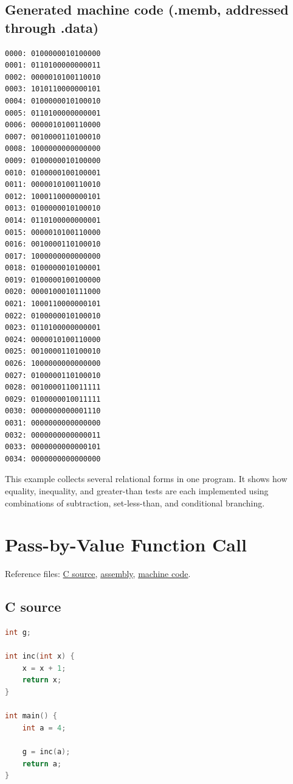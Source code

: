 \documentclass[12pt]{report}
\begin{document}
\subsection*{Generated machine code (.memb, addressed through .data)}
\begin{lstlisting}
0000: 0100000010100000
0001: 0110100000000011
0002: 0000010100110010
0003: 1010110000000101
0004: 0100000010100010
0005: 0110100000000001
0006: 0000010100110000
0007: 0010000110100010
0008: 1000000000000000
0009: 0100000010100000
0010: 0100000100100001
0011: 0000010100110010
0012: 1000110000000101
0013: 0100000010100010
0014: 0110100000000001
0015: 0000010100110000
0016: 0010000110100010
0017: 1000000000000000
0018: 0100000010100001
0019: 0100000100100000
0020: 0000100010111000
0021: 1000110000000101
0022: 0100000010100010
0023: 0110100000000001
0024: 0000010100110000
0025: 0010000110100010
0026: 1000000000000000
0027: 0100000110100010
0028: 0010000110011111
0029: 0100000010011111
0030: 0000000000001110
0031: 0000000000000000
0032: 0000000000000011
0033: 0000000000000101
0034: 0000000000000000
\end{lstlisting}

This example collects several relational forms in one program. It shows how equality, inequality, and greater-than tests are each implemented using combinations of subtraction, set-less-than, and conditional branching.

\section{Pass-by-Value Function Call}
Reference files:
\href{https://github.com/shorewind/Custom-ISA-Toolchain/blob/main/tests/feature-check/calls/value-param.c}{C source},
\href{https://github.com/shorewind/Custom-ISA-Toolchain/blob/main/tests/feature-check/calls/value-param.s}{assembly},
\href{https://github.com/shorewind/Custom-ISA-Toolchain/blob/main/tests/feature-check/calls/value-param.memb}{machine code}.

\subsection*{C source}
\begin{lstlisting}[language=C]
int g;

int inc(int x) {
    x = x + 1;
    return x;
}

int main() {
    int a = 4;

    g = inc(a);
    return a;
}
\end{lstlisting}
\end{document}
